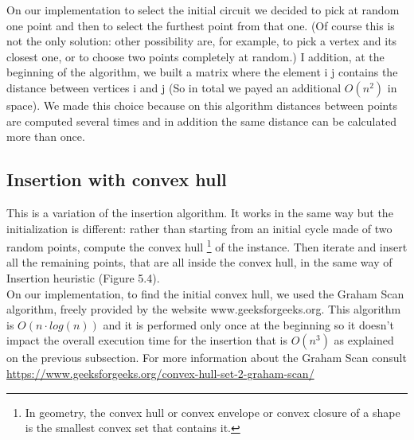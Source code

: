 \noindent On our implementation to select the initial circuit we decided to pick at random one point and then to select the furthest point from that one. (Of course this is not the only solution: other possibility are, for example, to pick a vertex and its closest one, or to choose two points completely at random.) I addition, at the beginning of the algorithm, we built a matrix where the element i j contains the distance between vertices i and j (So in total we payed an additional $O(n^2)$ in space). We made this choice because on this algorithm distances between points are computed several times and in addition the same distance can be calculated more than once.\\


\subsection{Insertion with convex hull}
This is a variation of the insertion algorithm. It works in the same way but the initialization is different: rather than starting from an initial cycle made of two random points, compute the convex hull \footnote{In geometry, the convex hull or convex envelope or convex closure of a shape is the smallest convex set that contains it. %
} of the instance. Then iterate and insert all the remaining points, that are all inside the convex hull, in the same way of Insertion heuristic (Figure 5.4).\\
On our implementation, to find the initial convex hull, we used the Graham Scan algorithm, freely provided by the website www.geeksforgeeks.org. This algorithm is $O(n \cdot log(n))$ and it is performed only once at the beginning so it doesn't impact the overall execution time for the insertion that is $O(n^3)$ as explained on the previous subsection. For more information about the Graham Scan consult \url{https://www.geeksforgeeks.org/convex-hull-set-2-graham-scan/}

